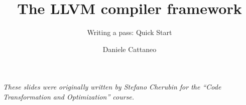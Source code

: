 

\author{Daniele Cattaneo}
\date{\DATE}
\title{The LLVM compiler framework}
\subtitle{Writing a pass: Quick Start}
\newcommand{\customdata}{Daniele Cattaneo <stefano.cherubin@polimi.it>}





\begin{frame}
\maketitle
\begin{center}
\itshape\scriptsize
These slides were originally written by
Stefano Cherubin for the
``Code Transformation and Optimization'' course.
\end{center}
\end{frame}






